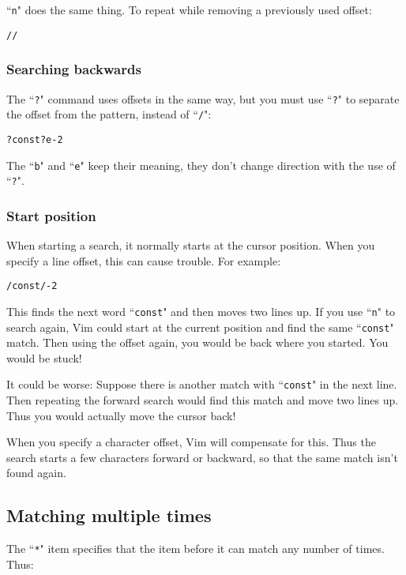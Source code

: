 ``\texttt{n}" does the same thing.
To repeat while removing a previously used offset:

\begin{Verbatim}[samepage=true]
 //
\end{Verbatim}

\subsubsection{Searching backwards}
The ``\texttt{?}" command uses offsets in the same way, but you must use ``\texttt{?}" to separate the offset from the pattern, instead of ``\texttt{/}":

\begin{Verbatim}[samepage=true]
 ?const?e-2
\end{Verbatim}

The ``\texttt{b}" and ``\texttt{e}" keep their meaning, they don't change direction with the use of ``\texttt{?}".
\subsubsection{Start position}
When starting a search, it normally starts at the cursor position.
When you specify a line offset, this can cause trouble.
For example:

\begin{Verbatim}[samepage=true]
 /const/-2
\end{Verbatim}

This finds the next word ``\texttt{const}" and then moves two lines up.
If you use ``\texttt{n}" to search again, Vim could start at the current position and find the same ``\texttt{const}" match.
Then using the offset again, you would be back where you started.
You would be stuck!

It could be worse: Suppose there is another match with ``\texttt{const}" in the next line.
Then repeating the forward search would find this match and move two lines up.
Thus you would actually move the cursor back!

When you specify a character offset, Vim will compensate for this.
Thus the search starts a few characters forward or backward, so that the same match isn't found again.
\subsection{Matching multiple times}
The ``\texttt{*}" item specifies that the item before it can match any number of times.
Thus:

